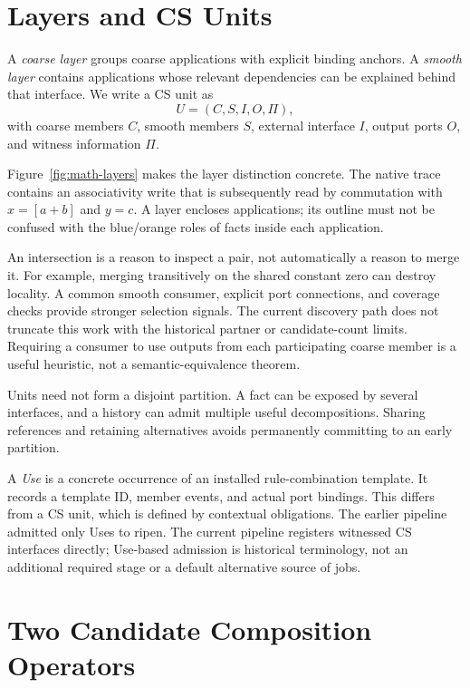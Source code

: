 \documentclass[11pt,a4paper]{article}
\begin{document}
\MathGuard

\section{Layers and CS Units}
A \emph{coarse layer} groups coarse applications with explicit binding anchors.
A \emph{smooth layer} contains applications whose relevant dependencies can be
explained behind that interface. We write a CS unit as
\begin{equation}
 U=(C,S,I,O,\Pi),
\end{equation}
with coarse members $C$, smooth members $S$, external interface $I$, output ports
$O$, and witness information $\Pi$.

Figure~\ref{fig:math-layers} makes the layer distinction concrete. The native
trace contains an associativity write that is subsequently read by commutation
with $x=[a+b]$ and $y=c$. A layer encloses applications; its outline must not be
confused with the blue/orange roles of facts inside each application.
\MathLayers

An intersection is a reason to inspect a pair, not automatically a reason to
merge it. For example, merging transitively on the shared constant zero can
destroy locality. A common smooth consumer, explicit port connections, and coverage checks provide
stronger selection signals. The current discovery path does not truncate this
work with the historical partner or candidate-count limits. Requiring a
consumer to use outputs from each participating coarse member is a useful
heuristic, not a semantic-equivalence theorem.

Units need not form a disjoint partition. A fact can be exposed by several
interfaces, and a history can admit multiple useful decompositions. Sharing
references and retaining alternatives avoids permanently committing to an early
partition.

A \emph{Use} is a concrete occurrence of an installed rule-combination template.
It records a template ID, member events, and actual port bindings. This differs
from a CS unit, which is defined by contextual obligations. The earlier pipeline
admitted only Uses to ripen. The current pipeline registers witnessed CS interfaces directly; Use-based
admission is historical terminology, not an additional required stage or a
default alternative source of jobs.

\section{Two Candidate Composition Operators}
\end{document}
